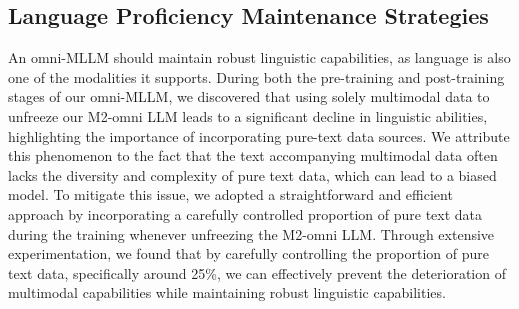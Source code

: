 \subsection{Language Proficiency Maintenance Strategies}\label{subsubsec-Language Maintenance}
An omni-MLLM should maintain robust linguistic capabilities, as language is also one of the modalities it supports. During both the pre-training and post-training stages of our omni-MLLM, we discovered that using solely multimodal data to unfreeze our M2-omni LLM leads to a significant decline in linguistic abilities, highlighting the importance of incorporating pure-text data sources. We attribute this phenomenon to the fact that the text accompanying multimodal data often lacks the diversity and complexity of pure text data, which can lead to a biased model.  To mitigate this issue, we adopted a straightforward and efficient approach by incorporating a carefully controlled proportion of pure text data during the training whenever unfreezing the M2-omni LLM. Through extensive experimentation, we found that by carefully controlling the proportion of pure text data, specifically around 25\%, we can effectively prevent the deterioration of multimodal capabilities while maintaining robust linguistic capabilities.




